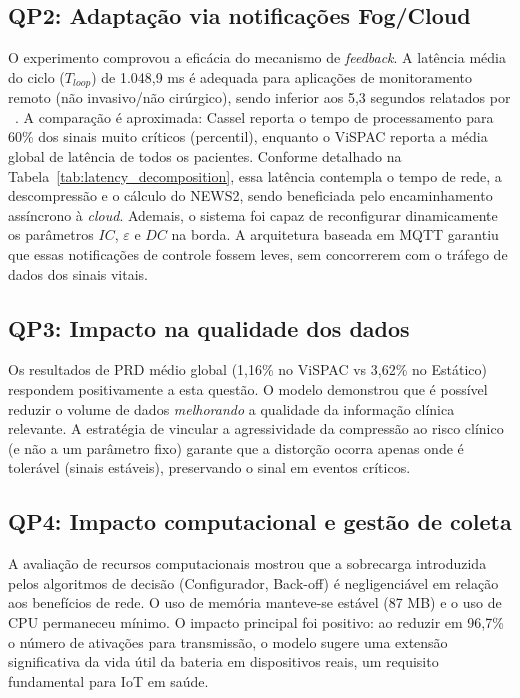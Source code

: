 \documentclass[twoside,english,brazilian]{UNISINOSmonografia}
\begin{document}
\subsection{QP2: Adaptação via notificações Fog/Cloud}
O experimento comprovou a eficácia do mecanismo de \textit{feedback}. A latência média do ciclo ($T_{loop}$) de 1.048,9 ms é adequada para aplicações de monitoramento remoto (não invasivo/não cirúrgico), sendo inferior aos 5,3 segundos relatados por ~\cite{CASSEL2024}. A comparação é aproximada: Cassel reporta o tempo de processamento para 60\% dos sinais muito críticos (percentil), enquanto o ViSPAC reporta a média global de latência de todos os pacientes. Conforme detalhado na Tabela~\ref{tab:latency_decomposition}, essa latência contempla o tempo de rede, a descompressão e o cálculo do NEWS2, sendo beneficiada pelo encaminhamento assíncrono à \textit{cloud}. Ademais, o sistema foi capaz de reconfigurar dinamicamente os parâmetros $IC$, $\varepsilon$ e $DC$ na borda. A arquitetura baseada em MQTT garantiu que essas notificações de controle fossem leves, sem concorrerem com o tráfego de dados dos sinais vitais.

\subsection{QP3: Impacto na qualidade dos dados}
Os resultados de PRD médio global (1,16\% no ViSPAC vs 3,62\% no Estático) respondem positivamente a esta questão. O modelo demonstrou que é possível reduzir o volume de dados \textit{melhorando} a qualidade da informação clínica relevante. A estratégia de vincular a agressividade da compressão ao risco clínico (e não a um parâmetro fixo) garante que a distorção ocorra apenas onde é tolerável (sinais estáveis), preservando o sinal em eventos críticos.

\subsection{QP4: Impacto computacional e gestão de coleta}
A avaliação de recursos computacionais mostrou que a sobrecarga introduzida pelos algoritmos de decisão (Configurador, Back-off) é negligenciável em relação aos benefícios de rede. O uso de memória manteve-se estável (87 MB) e o uso de CPU permaneceu mínimo. O impacto principal foi positivo: ao reduzir em 96,7\% o número de ativações para transmissão, o modelo sugere uma extensão significativa da vida útil da bateria em dispositivos reais, um requisito fundamental para IoT em saúde.
\end{document}
